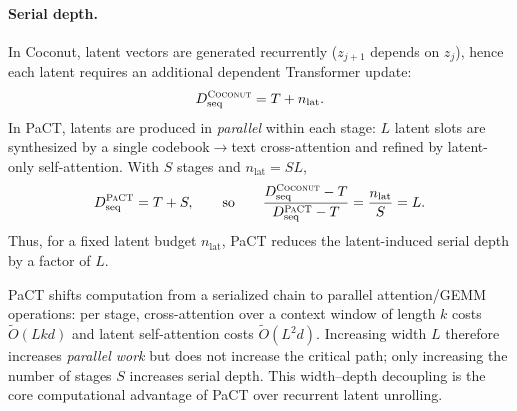 \paragraph{Serial depth.}
In Coconut, latent vectors are generated recurrently ($z_{j+1}$ depends on $z_j$), hence each latent requires
an additional dependent Transformer update:
\[
D_{\text{seq}}^{\textsc{Coconut}} = T + n_{\text{lat}}.
\]
In PaCT, latents are produced in \emph{parallel} within each stage: $L$ latent slots are synthesized by a single
codebook$\rightarrow$text cross-attention and refined by latent-only self-attention. With $S$ stages and
$n_{\text{lat}}=SL$,
\[
D_{\text{seq}}^{\textsc{PaCT}} = T + S,
\qquad\text{so}\qquad
\frac{D_{\text{seq}}^{\textsc{Coconut}}-T}{D_{\text{seq}}^{\textsc{PaCT}}-T}=\frac{n_{\text{lat}}}{S}=L.
\]
Thus, for a fixed latent budget $n_{\text{lat}}$, PaCT reduces the latent-induced serial depth by a factor of $L$.

PaCT shifts computation from a serialized chain to parallel attention/GEMM operations:
per stage, cross-attention over a context window of length $k$ costs $\tilde{O}(Lkd)$ and latent self-attention costs
$\tilde{O}(L^2d)$. Increasing width $L$ therefore increases \emph{parallel work} but does not increase the critical path;
only increasing the number of stages $S$ increases serial depth. This width--depth decoupling is the core computational
advantage of PaCT over recurrent latent unrolling.





